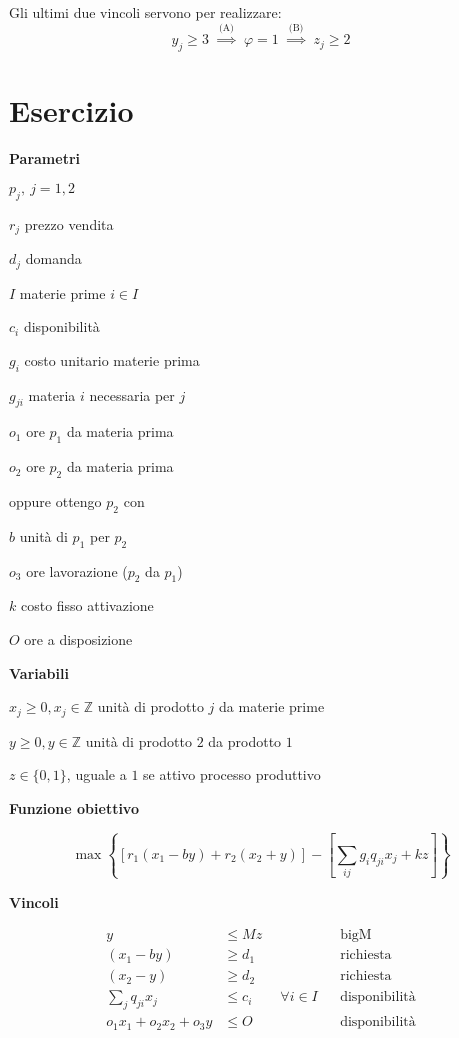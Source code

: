\documentclass[10pt,a4paper,twoside,openright]{book}
\newcounter{es}
\newcommand{\Es}{
	\stepcounter{es}
	\section{Esercizio \arabic{es}}
	}
\numberwithin{es}{chapter}
\newcommand{\Par}{\textbf{Parametri}}
\newcommand{\Var}{\textbf{Variabili}}
\newcommand{\Fob}{\textbf{Funzione obiettivo}}
\newcommand{\Vin}{\textbf{Vincoli}}
\begin{document}
Gli ultimi due vincoli servono per realizzare:
\begin{equation*}
	y_{j} \geq 3\ \ \overset{\text{(A)}}{\Rightarrow } \ \ \varphi =1\ \ \overset{\text{(B)}}{\Rightarrow } \ \ z_{j} \geq 2
\end{equation*}

\Es

\Par

$p_{j} ,\ j=1,2$

$r_{j}$ prezzo vendita

$d_{j}$ domanda

$I$ materie prime $i\in I$

$c_{i}$ disponibilità

$g_{i}$ costo unitario materie prima

$g_{ji}$ materia $i$ necessaria per $j$

$o_{1}$ ore $p_{1}$ da materia prima

$o_{2}$ ore $p_{2}$ da materia prima

oppure ottengo $p_{2}$ con

$b$ unità di $p_{1}$ per $p_{2}$

$o_{3}$ ore lavorazione ($p_{2}$ da $p_{1}$)

$k$ costo fisso attivazione

$O$ ore a disposizione

\Var

$x_{j} \geq 0,x_{j} \in \mathbb{Z}$ unità di prodotto $j$ da materie prime

$y\geq 0,y\in \mathbb{Z}$ unità di prodotto $2$ da prodotto $1$

$z\in \{0,1\}$, uguale a $1$ se attivo processo produttivo

\Fob

\begin{equation*}
	\max\left\{[ r_{1}( x_{1} -by) +r_{2}( x_{2} +y)] -\left[\sum _{ij} g_{i} q_{ji} x_{j} +kz\right]\right\}
\end{equation*}

\Vin

\begin{align*}
	y&\leq Mz && \text{bigM}\\
	( x_{1} -by) &\geq d_{1} && \text{richiesta}\\
	( x_{2} -y) &\geq d_{2} && \text{richiesta}\\
	\sum _{j} q_{ji} x_{j} &\leq c_{i} \qquad\forall i\in I && \text{disponibilità}\\
	o_{1} x_{1} +o_{2} x_{2} +o_{3} y&\leq O && \text{disponibilità}\\
\end{align*}
\end{document}
